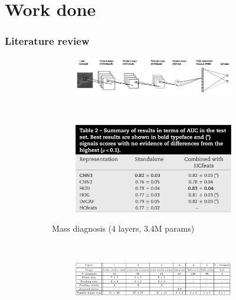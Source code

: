 \documentclass{beamer}
\begin{document}
	\section[Work done]{Work done}
	\begin{frame}
		\frametitle{Literature review}
		\vspace{15pt}
		\begin{figure}[h]
			\centering
			\begin{subfigure}{0.48\textwidth}
				\begin{subfigure}{\textwidth}
					\includegraphics[width=\textwidth]{plots/arevalo.png}
				\end{subfigure}
				~
				\begin{subfigure}{\textwidth}
					\includegraphics[width=\textwidth]{plots/arevaloResults.png}
				\end{subfigure}
				\caption{Mass diagnosis (4 layers, 3.4M params)}
			\end{subfigure}
			~
			\begin{subfigure}{0.48\textwidth}
				\begin{subfigure}{\textwidth}
					\includegraphics[width=\textwidth]{plots/dubrovina1.png}

\end{subfigure}
\end{subfigure}
\end{figure}
\end{frame}
\end{document}

